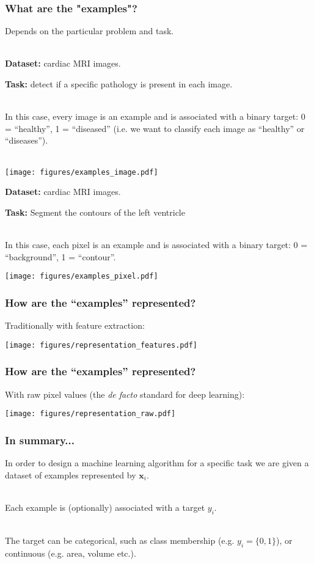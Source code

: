 \documentclass[notes]{beamer}          %
\begin{document}
\begin{frame}[allowframebreaks]
\frametitle{What are the "examples"?}

Depends on the particular problem and task. \\~\

\textbf{Dataset:} cardiac MRI images. 

\textbf{Task:} detect if a specific pathology is present in each image. \\~\

\small{In this case, every image is an example and is associated with a binary target: 0 = ``healthy'', 1 = ``diseased'' (i.e. we want to classify each image as ``healthy'' or ``diseases''). } \\~\

\begin{center}
\texttt{[image: figures/examples\_image.pdf]}
\end{center}

\framebreak

\textbf{Dataset:} cardiac MRI images. 

\textbf{Task:} Segment the contours of the left ventricle \\~\

In this case, each pixel is an example and is associated with a binary target: 0 = ``background'', 1 = ``contour''.
\begin{center}
\texttt{[image: figures/examples\_pixel.pdf]}
\end{center}

\end{frame}


\begin{frame}
\frametitle{How are the ``examples'' represented?}
Traditionally with feature extraction:
\begin{center}
\texttt{[image: figures/representation\_features.pdf]}
\end{center}
\end{frame}

\begin{frame}
\frametitle{How are the ``examples'' represented?}
With raw pixel values (the \textit{de facto} standard for deep learning):
\begin{center}
\texttt{[image: figures/representation\_raw.pdf]}
\end{center}
\end{frame}

\begin{frame}
\frametitle{In summary...}

In order to design a machine learning algorithm for a specific task we are given a dataset of examples represented by $\mathbf{x}_i$. \\~\

Each example is (optionally) associated with a target $y_i$.  \\~\

The target can be categorical, such as class membership (e.g. $y_i = \{0, 1\}$), or continuous (e.g. area, volume etc.). \\~\

\end{frame}
\end{document}

